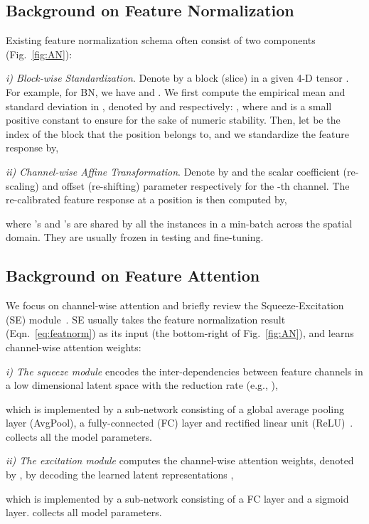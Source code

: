 \documentclass[runningheads]{llncs}
\begin{document}
\subsection{Background on Feature Normalization}\label{sec:featnorm}
Existing feature normalization schema often consist of two components (Fig.~\ref{fig:AN}):  

\textit{i) Block-wise Standardization}.  Denote by  a block (slice) in a given 4-D tensor . For example, for BN, we have  and . We first compute the empirical mean and standard deviation in , denoted by  and  respectively: ,  
where  and  is a small positive constant to ensure  for the sake of numeric stability. Then, let  be the index of the block that the position  belongs to, and we standardize the feature response by, 



\textit{ii) Channel-wise Affine Transformation}. Denote by  and  the scalar coefficient (re-scaling) and offset (re-shifting)  parameter respectively for the -th channel.  The re-calibrated feature response at a position  is then computed by, 

where 's and 's are shared by all the instances in a min-batch across the spatial domain. They are usually frozen in testing and fine-tuning. 

\subsection{Background on Feature Attention}\label{sec:featattn}
We focus on channel-wise attention and briefly review the Squeeze-Excitation (SE) module~\cite{SENet}. SE usually takes the feature normalization result (Eqn.~\ref{eq:featnorm}) as its input (the bottom-right of Fig.~\ref{fig:AN}), and learns channel-wise attention weights: 

\textit{i) The squeeze module} encodes the inter-dependencies between feature channels  in a low dimensional latent space with the reduction rate  (e.g., ), 
    
    which is implemented by a sub-network consisting of a global average pooling layer (AvgPool), a fully-connected (FC) layer and rectified linear unit (ReLU)~\cite{AlexNet}.  collects all the model parameters. 

\textit{ii) The excitation module} computes the channel-wise attention weights, denoted by , by decoding the learned latent representations , 

which is implemented by a sub-network consisting of a FC layer and a sigmoid layer.  collects all model parameters.
\end{document}
